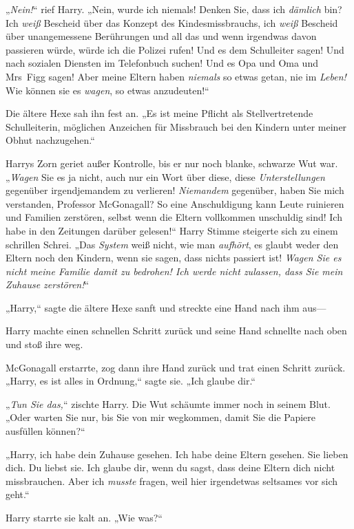 {„\emph{Nein!}“ rief Harry. „Nein, wurde ich niemals! Denken Sie, dass ich \emph{dämlich} bin? Ich \emph{weiß} Bescheid über das Konzept des Kindesmissbrauchs, ich \emph{weiß} Bescheid über unangemessene Berührungen und all das und wenn irgendwas davon passieren würde, würde ich die Polizei rufen! Und es dem Schulleiter sagen! Und nach sozialen Diensten im Telefonbuch suchen! Und es Opa und Oma und Mrs~Figg sagen! Aber meine Eltern haben \emph{niemals} so etwas getan, nie im \emph{Leben!} Wie können sie es \emph{wagen}, so etwas anzudeuten!“

Die ältere Hexe sah ihn fest an. „Es ist meine Pflicht als Stellvertretende Schulleiterin, möglichen Anzeichen für Missbrauch bei den Kindern unter meiner Obhut nachzugehen.“

Harrys Zorn geriet außer Kontrolle, bis er nur noch blanke, schwarze Wut war. „\emph{Wagen} Sie es ja nicht, auch nur ein Wort über diese, diese \emph{Unterstellungen} gegenüber irgendjemandem zu verlieren! \emph{Niemandem} gegenüber, haben Sie mich verstanden, Professor McGonagall? So eine Anschuldigung kann Leute ruinieren und Familien zerstören, selbst wenn die Eltern vollkommen unschuldig sind! Ich habe in den Zeitungen darüber gelesen!“ Harry Stimme steigerte sich zu einem schrillen Schrei. „Das \emph{System} weiß nicht, wie man \emph{aufhört}, es glaubt weder den Eltern noch den Kindern, wenn sie sagen, dass nichts passiert ist! \emph{Wagen Sie es nicht meine Familie damit zu bedrohen! Ich werde nicht zulassen, dass Sie mein} \emph{Zuhause zerstören!}“

„Harry,“ sagte die ältere Hexe sanft und streckte eine Hand nach ihm aus—

Harry machte einen schnellen Schritt zurück und seine Hand schnellte nach oben und stoß ihre weg.

McGonagall erstarrte, zog dann ihre Hand zurück und trat einen Schritt zurück. „Harry, es ist alles in Ordnung,“ sagte sie. „Ich glaube dir.“

„\emph{Tun Sie das,}“ zischte Harry. Die Wut schäumte immer noch in seinem Blut. „Oder warten Sie nur, bis Sie von mir wegkommen, damit Sie die Papiere ausfüllen können?“

„Harry, ich habe dein Zuhause gesehen. Ich habe deine Eltern gesehen. Sie lieben dich. Du liebst sie. Ich glaube dir, wenn du sagst, dass deine Eltern dich nicht missbrauchen. Aber ich \emph{musste} fragen, weil hier irgendetwas seltsames vor sich geht.“

Harry starrte sie kalt an. „Wie was?“

}

